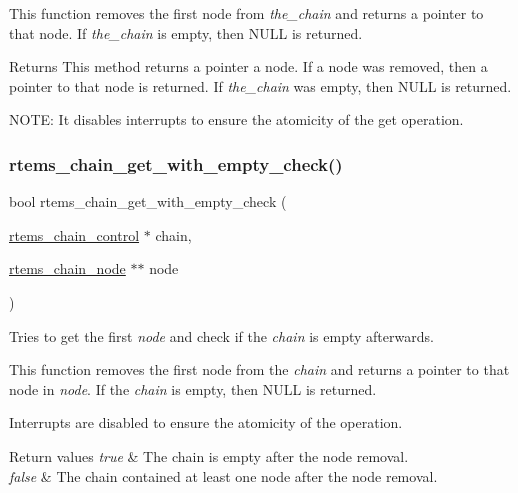 This function removes the first node from {\itshape the\+\_\+chain} and returns a pointer to that node. If {\itshape the\+\_\+chain} is empty, then N\+U\+LL is returned.

\begin{DoxyReturn}{Returns}
This method returns a pointer a node. If a node was removed, then a pointer to that node is returned. If {\itshape the\+\_\+chain} was empty, then N\+U\+LL is returned.
\end{DoxyReturn}
N\+O\+TE\+: It disables interrupts to ensure the atomicity of the get operation. \mbox{\label{group__ClassicChains_gad87341d58edec44ef841a5103a922e5c}} 
\subsubsection{\texorpdfstring{rtems\_chain\_get\_with\_empty\_check()}{rtems\_chain\_get\_with\_empty\_check()}}
{\footnotesize\ttfamily bool rtems\+\_\+chain\+\_\+get\+\_\+with\+\_\+empty\+\_\+check (\begin{DoxyParamCaption}\item[{\mbox{\hyperlink{unionChain__Control}{rtems\+\_\+chain\+\_\+control}} $\ast$}]{chain,  }\item[{\mbox{\hyperlink{structChain__Node__struct}{rtems\+\_\+chain\+\_\+node}} $\ast$$\ast$}]{node }\end{DoxyParamCaption})}



Tries to get the first {\itshape node} and check if the {\itshape chain} is empty afterwards. 

This function removes the first node from the {\itshape chain} and returns a pointer to that node in {\itshape node}. If the {\itshape chain} is empty, then {\ttfamily N\+U\+LL} is returned.

Interrupts are disabled to ensure the atomicity of the operation.


\begin{DoxyRetVals}{Return values}
{\em true} & The chain is empty after the node removal. \\
\hline
{\em false} & The chain contained at least one node after the node removal. \\
\hline
\end{DoxyRetVals}
\mbox{\label{group__ClassicChains_gae041dcf53508f057ea88b8f106cac330}} 

